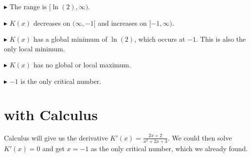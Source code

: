 \documentclass{ximera}
\begin{document}
$\blacktriangleright$  The range is $[\ln(2), \infty)$.

$\blacktriangleright$  $K(x)$ decreases on $(\infty, -1]$ and increases on $[-1, \infty)$.


$\blacktriangleright$  $K(x)$ has a global minimum of $\ln(2)$, which occurs at $-1$.  This is also the only local minimum.

$\blacktriangleright$  $K(x)$ has no global or local maximum.

$\blacktriangleright$  $-1$ is the only critical number.













\section{with Calculus}

Calculus will give us the derivative $K'(x) = \frac{2x+2}{x^2+2x+3}$.  We could then solve $K'(x) = 0$ and get $x=-1$ as the only critical number, which we already found.
\end{document}

